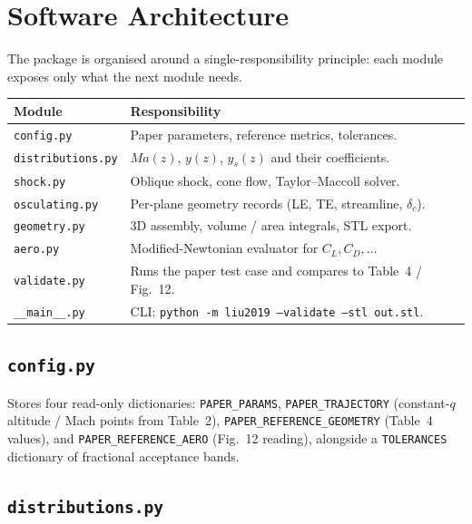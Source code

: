 \documentclass[11pt,a4paper]{article}
\newcommand{\Ma}{\mathit{Ma}}
\newcommand{\dc}{\delta_{c}}
\begin{document}
\section{Software Architecture}

The package is organised around a single-responsibility principle:
each module exposes only what the next module needs.

\begin{center}
\begin{tabular}{@{}p{}p{}@{}}
\toprule
Module & Responsibility \\
\midrule
\texttt{config.py}        & Paper parameters, reference metrics, tolerances. \\
\texttt{distributions.py} & $\Ma(z)$, $y(z)$, $y_{s}(z)$ and their coefficients. \\
\texttt{shock.py}         & Oblique shock, cone flow, Taylor--Maccoll solver. \\
\texttt{osculating.py}    & Per-plane geometry records (LE, TE, streamline, $\dc$). \\
\texttt{geometry.py}      & 3D assembly, volume / area integrals, STL export. \\
\texttt{aero.py}          & Modified-Newtonian evaluator for $C_{L}, C_{D}, \ldots$ \\
\texttt{validate.py}      & Runs the paper test case and compares to Table~4 / Fig.~12. \\
\texttt{\_\_main\_\_.py}  & CLI: \texttt{python -m liu2019 --validate --stl out.stl}. \\
\bottomrule
\end{tabular}
\end{center}

\subsection{\texttt{config.py}}

Stores four read-only dictionaries: \texttt{PAPER\_PARAMS},
\texttt{PAPER\_TRAJECTORY} (constant-$q$ altitude / Mach points from
Table~2), \texttt{PAPER\_REFERENCE\_GEOMETRY} (Table~4 values), and
\texttt{PAPER\_REFERENCE\_AERO} (Fig.~12 reading), alongside a
\texttt{TOLERANCES} dictionary of fractional acceptance bands.

\subsection{\texttt{distributions.py}}
\end{document}
